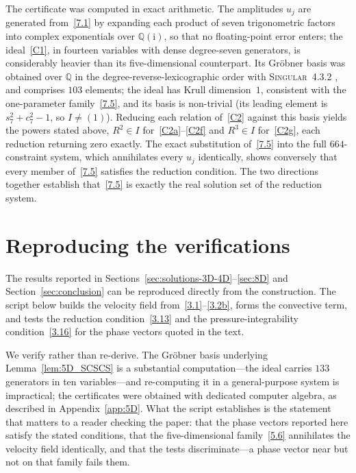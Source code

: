 \documentclass[11pt]{jfm}
\numberwithin{equation}{section}
\begin{document}
The certificate was computed in exact arithmetic. The amplitudes $u_j$ are
generated from~\eqref{7.1} by expanding each product of seven trigonometric
factors into complex exponentials over $\mathbb{Q}(\mathrm{i})$, so that no
floating-point error enters; the ideal~\eqref{C1}, in fourteen variables with
dense degree-seven generators, is considerably heavier than its five-dimensional
counterpart. Its Gr\"obner basis was obtained over $\mathbb{Q}$ in the
degree-reverse-lexicographic order with \textsc{Singular}~4.3.2
\citep{singular}, and comprises $103$ elements; the ideal has Krull
dimension~$1$, consistent with the one-parameter family~\eqref{7.5}, and its
basis is non-trivial (its leading element is $s_7^2+c_7^2-1$, so $I\neq(1)$).
Reducing each relation of~\eqref{C2} against this basis yields the powers stated
above, $R^2\in I$ for~\eqref{C2a}--\eqref{C2f} and $R^3\in I$ for~\eqref{C2g},
each reduction returning zero exactly. The exact substitution of~\eqref{7.5}
into the full $664$-constraint system, which annihilates every $u_j$ identically,
shows conversely that every member of~\eqref{7.5} satisfies the reduction
condition. The two directions together establish that~\eqref{7.5} is exactly the
real solution set of the reduction system.

\section{Reproducing the verifications}
\label{app:verify}
The results reported in Sections~\ref{sec:solutions-3D-4D}--\ref{sec:8D} and
Section~\ref{sec:conclusion} can be reproduced
directly from the construction. The script below builds the velocity field
from~\eqref{3.1}--\eqref{3.2b}, forms the convective term, and tests the reduction
condition~\eqref{3.13} and the pressure-integrability condition~\eqref{3.16} for the phase vectors
quoted in the text.

We verify rather than re-derive. The Gr\"obner basis underlying Lemma~\ref{lem:5D_SCSCS} is a
substantial computation---the ideal carries $133$ generators in ten variables---and re-computing it
in a general-purpose system is impractical; the certificates were obtained with dedicated computer
algebra, as described in Appendix~\ref{app:5D}. What the script establishes is the statement that
matters to a reader checking the paper: that the phase vectors reported here satisfy the stated
conditions, that the five-dimensional family~\eqref{5.6} annihilates the velocity field
identically, and that the tests discriminate---a phase vector near but not on that family fails
them.
\end{document}
